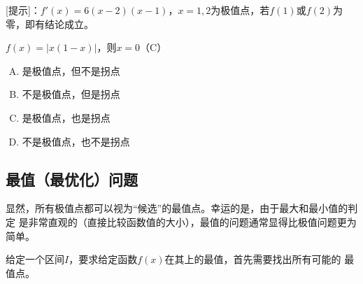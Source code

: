 % 

[提示]：$f'(x)=6(x-2)(x-1)$，$x=1,2$为极值点，若$f(1)$或$f(2)$为零，即有结论成立。

\egz $f(x)=|x(1-x)|$，则$x=0$（C）
\begin{enumerate}[A)]
  \setlength{\itemindent}{1cm}
  \item 是极值点，但不是拐点
  \item 不是极值点，但是拐点
  \item 是极值点，也是拐点
  \item 不是极值点，也不是拐点
\end{enumerate}


\subsection{最值（最优化）问题}

显然，所有极值点都可以视为“候选”的最值点。幸运的是，由于最大和最小值的判定
是非常直观的（直接比较函数值的大小），最值的问题通常显得比极值问题更为简单。

给定一个区间$I$，要求给定函数$f(x)$在其上的最值，首先需要找出所有可能的
最值点。

